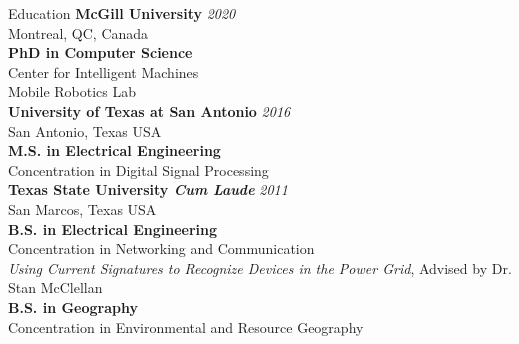 \documentclass{resume} %
\begin{document}

\begin{rSection}{Education}
{\bf McGill University} \hfill {\em 2020} \\ 
Montreal, QC, Canada \\
{\bf PhD in Computer Science} \\
Center for Intelligent Machines \\
Mobile Robotics Lab \\

{\bf University of Texas at San Antonio} \hfill {\em 2016} \\ 
San Antonio, Texas USA \\
{\bf M.S. in Electrical Engineering} \\
Concentration in Digital Signal Processing \\

{\bf Texas State University \textit{Cum Laude}} \hfill {\em 2011} \\ 
San Marcos, Texas USA \\
{\bf B.S. in Electrical Engineering} \\
Concentration in Networking and Communication  \\
\textit{Using Current Signatures to Recognize Devices in the Power Grid}, Advised by Dr. Stan McClellan  \smallskip \\
{\bf B.S. in Geography} \\
Concentration in Environmental and Resource Geography \\
\end{rSection}

\end{document}
